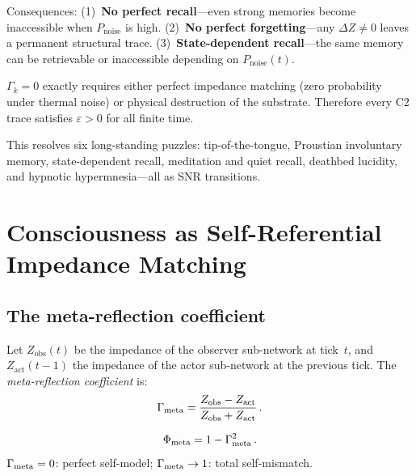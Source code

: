 \documentclass[aps,pre,twocolumn,superscriptaddress,floatfix]{revtex4-2}
\begin{document}
\noindent
Consequences:
(1)~\textbf{No perfect recall}---even strong memories
become inaccessible when $P_{\text{noise}}$ is high.
(2)~\textbf{No perfect forgetting}---any $\Delta Z \neq 0$
leaves a permanent structural trace.
(3)~\textbf{State-dependent recall}---the same memory can
be retrievable or inaccessible depending on
$P_{\text{noise}}(t)$.

\begin{corollary}
\label{cor:no-erasure}
$\Gamma_k = 0$ exactly requires either perfect impedance
matching (zero probability under thermal noise) or physical
destruction of the substrate.
Therefore every C2 trace satisfies $\varepsilon > 0$ for all
finite time.
\end{corollary}

This resolves six long-standing puzzles: tip-of-the-tongue,
Proustian involuntary memory, state-dependent recall,
meditation and quiet recall, deathbed lucidity,
and hypnotic hypermnesia---all as SNR transitions.


\section{Consciousness as Self-Referential Impedance Matching}
\label{sec:consciousness}

\subsection{The meta-reflection coefficient}

\begin{definition}
Let $Z_{\text{obs}}(t)$ be the impedance of the observer
sub-network at tick~$t$, and $Z_{\text{act}}(t-1)$ the
impedance of the actor sub-network at the previous tick.
The \emph{meta-reflection coefficient} is:
\begin{equation}
  \Gamma_{\text{meta}} = \frac{Z_{\text{obs}} - Z_{\text{act}}}
                 {Z_{\text{obs}} + Z_{\text{act}}}\,.
  \label{eq:Gamma-meta}
\end{equation}
\end{definition}

\begin{definition}
\begin{equation}
  \Phi_{\text{meta}} = 1 - \Gamma_{\text{meta}}^2\,.
  \label{eq:Phi-meta}
\end{equation}
$\Gamma_{\text{meta}}=0$: perfect self-model; $\Gamma_{\text{meta}}\to 1$: total
self-mismatch.
\end{definition}
\end{document}
